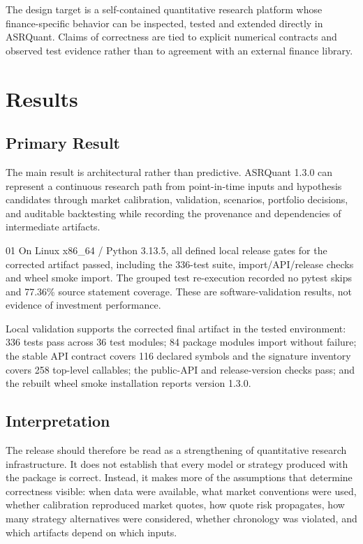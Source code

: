 \documentclass{asrpaper}
\begin{document}
The design target is a self-contained quantitative research platform whose finance-specific behavior can be inspected, tested and extended directly in ASRQuant. Claims of correctness are tied to explicit numerical contracts and observed test evidence rather than to agreement with an external finance library.

\section{Results}
\subsection{Primary Result}
The main result is architectural rather than predictive. ASRQuant 1.3.0 can represent a continuous research path from point-in-time inputs and hypothesis candidates through market calibration, validation, scenarios, portfolio decisions, and auditable backtesting while recording the provenance and dependencies of intermediate artifacts.

\begin{asrclaim}{01}
On Linux x86\_64 / Python 3.13.5, all defined local release gates for the corrected artifact passed, including the 336-test suite, import/API/release checks and wheel smoke import. The grouped test re-execution recorded no pytest skips and 77.36\% source statement coverage. These are software-validation results, not evidence of investment performance.
\end{asrclaim}

Local validation supports the corrected final artifact in the tested environment: 336 tests pass across 36 test modules; 84 package modules import without failure; the stable API contract covers 116 declared symbols and the signature inventory covers 258 top-level callables; the public-API and release-version checks pass; and the rebuilt wheel smoke installation reports version 1.3.0.

\subsection{Interpretation}
The release should therefore be read as a strengthening of quantitative research infrastructure. It does not establish that every model or strategy produced with the package is correct. Instead, it makes more of the assumptions that determine correctness visible: when data were available, what market conventions were used, whether calibration reproduced market quotes, how quote risk propagates, how many strategy alternatives were considered, whether chronology was violated, and which artifacts depend on which inputs.
\end{document}
